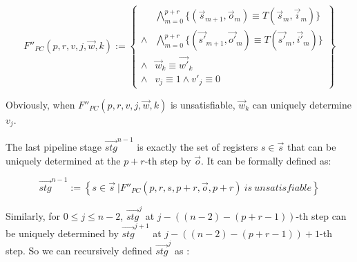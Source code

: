 \documentclass[runningheads,a4paper,orivec]{llncs}
\begin{document}
\begin{equation}\label{uniqt2}
F''_{PC}(p,r,v,j,\vec{w},k):=
\left\{
\begin{array}{cc}
&\bigwedge_{m=0}^{p+r}
\{
(\vec{s}_{m+1},\vec{o}_m)\equiv T(\vec{s}_m,\vec{i}_m)
\}
\\
\wedge&\bigwedge_{m=0}^{p+r}
\{
(\vec{s'}_{m+1},\vec{o'}_m)\equiv T(\vec{s'}_m,\vec{i'}_m)
\}
\\
\wedge&\vec{w}_{k}\equiv \vec{w'}_{k} \\
\wedge& v_{j}\equiv 1 \wedge  v'_{j}\equiv 0 
\end{array}
\right\}
\end{equation}

Obviously,
when $F''_{PC}(p,r,v,j,\vec{w},k)$ is unsatisfiable,
$\vec{w}_k$ can uniquely determine $v_j$.

The last pipeline stage $\vec{stg}^{n-1}$ is 
exactly the set of registers $s\in \vec{s}$ 
that can be uniquely determined at the $p+r$-th step by $\vec{o}$.
It can be formally defined as:

\begin{equation}\label{stgn_1}
 \vec{stg}^{n-1} := 
\left\{
 s\in \vec{s} ~| 
 F''_{PC}(p,r,
 s,p+r,
 \vec{o},p+r)
 ~is~unsatisfiable
\right\}
\end{equation}

% 

Similarly,
for $0\le j\le n-2$,
$\vec{stg}^j$ at $j-((n-2)-(p+r-1))$-th step
can be uniquely determined by $\vec{stg}^{j+1}$ at $j-((n-2)-(p+r-1))+1$-th step.
So we can recursively defined $\vec{stg}^j$ as :
\end{document}
